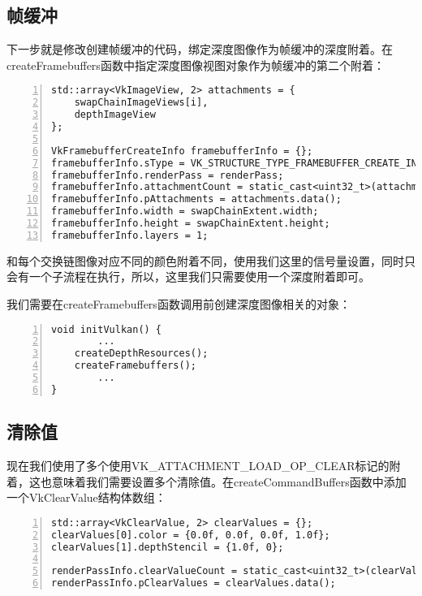 \documentclass{ctexart}
\begin{document}
\subsection{帧缓冲}

下一步就是修改创建帧缓冲的代码，绑定深度图像作为帧缓冲的深度附着。在createFramebuffers函数中指定深度图像视图对象作为帧缓冲的第二个附着：

\begin{lstlisting}[language={[ANSI]C},keywordstyle=\color{blue!70},commentstyle=\color{red!50!green!50!blue!50},frame=shadowbox, rulesepcolor=\color{red!20!green!20!blue!20},basicstyle=\small,numbers=left, numberstyle=\tiny,breaklines=true]
std::array<VkImageView, 2> attachments = {
	swapChainImageViews[i],
	depthImageView
};

VkFramebufferCreateInfo framebufferInfo = {};
framebufferInfo.sType = VK_STRUCTURE_TYPE_FRAMEBUFFER_CREATE_INFO;
framebufferInfo.renderPass = renderPass;
framebufferInfo.attachmentCount = static_cast<uint32_t>(attachments.size());
framebufferInfo.pAttachments = attachments.data();
framebufferInfo.width = swapChainExtent.width;
framebufferInfo.height = swapChainExtent.height;
framebufferInfo.layers = 1;
\end{lstlisting}

和每个交换链图像对应不同的颜色附着不同，使用我们这里的信号量设置，同时只会有一个子流程在执行，所以，这里我们只需要使用一个深度附着即可。

我们需要在createFramebuffers函数调用前创建深度图像相关的对象：

\begin{lstlisting}[language={[ANSI]C},keywordstyle=\color{blue!70},commentstyle=\color{red!50!green!50!blue!50},frame=shadowbox, rulesepcolor=\color{red!20!green!20!blue!20},basicstyle=\small,numbers=left, numberstyle=\tiny,breaklines=true]
void initVulkan() {
		...
	createDepthResources();
	createFramebuffers();
		...
}
\end{lstlisting}

\subsection{清除值}

现在我们使用了多个使用VK\_ATTACHMENT\_LOAD\_OP\_CLEAR标记的附着，这也意味着我们需要设置多个清除值。在createCommandBuffers函数中添加一个VkClearValue结构体数组：

\begin{lstlisting}[language={[ANSI]C},keywordstyle=\color{blue!70},commentstyle=\color{red!50!green!50!blue!50},frame=shadowbox, rulesepcolor=\color{red!20!green!20!blue!20},basicstyle=\small,numbers=left, numberstyle=\tiny,breaklines=true]
std::array<VkClearValue, 2> clearValues = {};
clearValues[0].color = {0.0f, 0.0f, 0.0f, 1.0f};
clearValues[1].depthStencil = {1.0f, 0};

renderPassInfo.clearValueCount = static_cast<uint32_t>(clearValues.size());
renderPassInfo.pClearValues = clearValues.data();
\end{lstlisting}
\end{document}
